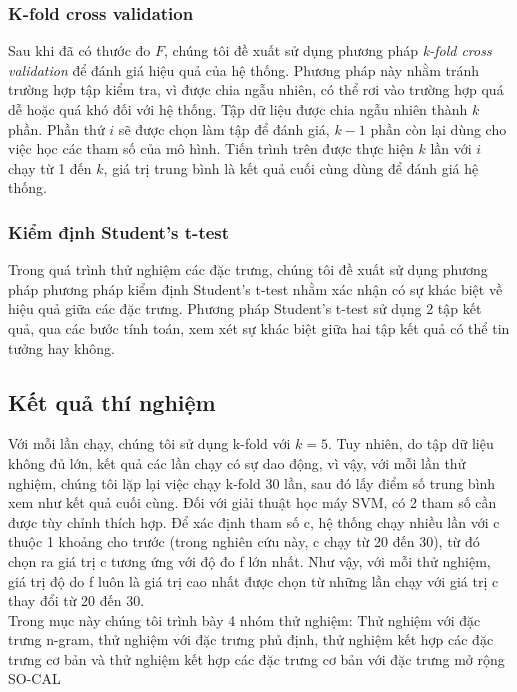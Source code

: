 \subsubsection*{K-fold cross validation}
Sau khi đã có thước đo \(F\), chúng tôi đề xuất sử dụng phương pháp \textit{k-fold cross validation} để đánh giá hiệu quả của hệ thống. Phương pháp này nhằm tránh trường hợp tập kiểm tra, vì được chia ngẫu nhiên, có thể rơi vào trường hợp quá dễ hoặc quá khó đối với hệ thống. Tập dữ liệu được chia ngẫu nhiên thành \(k\) phần. Phần thứ \(i\) sẽ được chọn làm tập để đánh giá, \(k-1\) phần còn lại dùng cho việc học các tham số của mô hình. Tiến trình trên được thực hiện \(k\) lần với \(i\) chạy từ 1 đến \(k\), giá trị trung bình là kết quả cuối cùng dùng để đánh giá hệ thống.
\subsubsection*{Kiểm định Student's t-test}
Trong quá trình thử nghiệm các đặc trưng, chúng tôi đề xuất sử dụng phương pháp phương pháp kiểm định Student's t-test nhằm xác nhận có sự khác biệt về hiệu quả giữa các đặc trưng. Phương pháp Student's t-test sử dụng 2 tập kết quả, qua các bước tính toán, xem xét sự khác biệt giữa hai tập kết quả có thể tin tưởng hay không. %
\subsection{Kết quả thí nghiệm}
Với mỗi lần chạy, chúng tôi sử dụng k-fold với $k=5$. Tuy nhiên, do tập dữ liệu không đủ lớn, kết quả các lần chạy có sự dao động, vì vậy, với mỗi lần thử nghiệm, chúng tôi lặp lại việc chạy k-fold 30 lần, sau đó lấy điểm số trung bình xem như kết quả cuối cùng. Đối với giải thuật học máy SVM, có 2 tham số cần được tùy chỉnh thích hợp. Để xác định tham số c, hệ thống chạy nhiều lần với c thuộc 1 khoảng cho trước (trong nghiên cứu này, c chạy từ 20 đến 30), từ đó chọn ra giá trị c tương ứng với độ đo f lớn nhất. Như vậy, với mỗi thử nghiệm, giá trị độ do f luôn là giá trị cao nhất được chọn từ những lần chạy với giá trị c thay đổi từ 20 đến 30. \\

Trong mục này chúng tôi trình bày 4 nhóm thử nghiệm: Thử nghiệm với đặc trưng n-gram, thử nghiệm với đặc trưng phủ định, thử nghiệm kết hợp các đặc trưng cơ bản và thử nghiệm kết hợp các đặc trưng cơ bản với đặc trưng mở rộng SO-CAL
